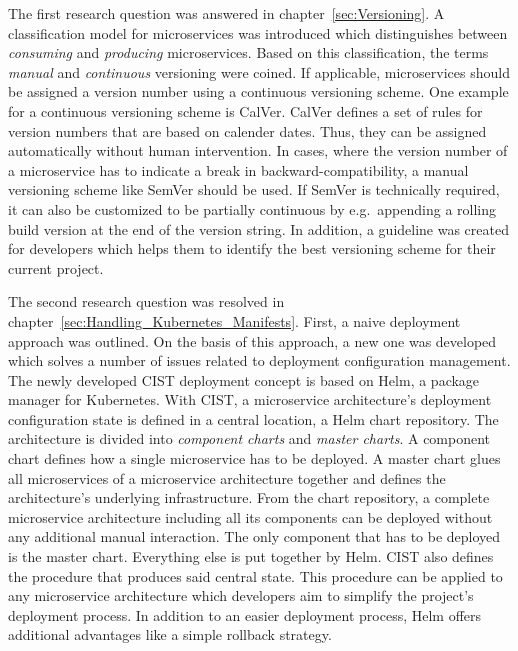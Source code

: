 The first research question was answered in chapter~\ref{sec:Versioning}. A
classification model for microservices was introduced which distinguishes
between \textit{consuming} and \textit{producing} microservices. Based on this
classification, the terms \textit{manual} and \textit{continuous} versioning
were coined. If applicable, microservices should be assigned a version number
using a continuous versioning scheme. One example for a continuous versioning
scheme is CalVer. CalVer defines a set of rules for version numbers that are
based on calender dates. Thus, they can be assigned automatically without human
intervention. In cases, where the version number of a microservice has to
indicate a break in backward-compatibility, a manual versioning scheme like
SemVer should be used. If SemVer is technically required, it can also be
customized to be partially continuous by e.g.\ appending a rolling build
version at the end of the version string. In addition, a guideline was
created for developers which helps them to identify the best versioning scheme
for their current project.

The second research question was resolved in
chapter~\ref{sec:Handling_Kubernetes_Manifests}. First, a naive deployment
approach was outlined. On the basis of this approach, a new one was developed
which solves a number of issues related to deployment configuration management.
The newly developed \ac{CIST} deployment concept is based on Helm, a package
manager for Kubernetes. With \ac{CIST}, a microservice architecture's
deployment configuration state is defined in a central location, a Helm chart
repository. The architecture is divided into \textit{component charts} and
\textit{master charts}. A component chart defines how a single microservice has
to be deployed. A master chart glues all microservices of a microservice
architecture together and defines the architecture's underlying infrastructure.
From the chart repository, a complete microservice architecture including all
its components can be deployed without any additional manual interaction. The
only component that has to be deployed is the master chart. Everything else is
put together by Helm. \ac{CIST} also defines the procedure that produces said
central state. This procedure can be applied to any microservice architecture
which developers aim to simplify the project's deployment process. In addition
to an easier deployment process, Helm offers additional advantages like a
simple rollback strategy.

